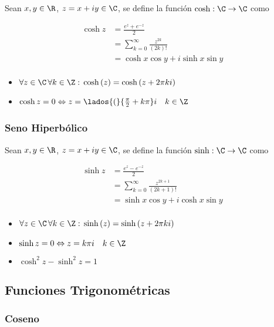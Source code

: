 Sean $x,y\in\R$, $z = x+iy\in\C$, se define la función $\cosh: \C \to \C$ como

\begin{equation}
\begin{split}
    \cosh{z} &= \frac{e^z+e^{-z}}{2}\\
    &= \sum^{\infty}_{k=0}\frac{z^{2k}}{(2k)!}\\
    &= \cosh{x}\cos{y}+i\sinh{x}\sin{y}\\
\end{split}
\nonumber
\end{equation}

\begin{itemize}
    \item $\forall z\in\C\,\forall k\in\Z:\,\cosh{(z)}=\cosh{(z+2\pi ki)}$
    \item $\cosh{z} = 0\Leftrightarrow z = \lados{(}{\frac{\pi}{2}+k\pi}i \quad k\in\Z$
\end{itemize}

\subsubsection{Seno Hiperbólico}

Sean $x,y\in\R$, $z = x+iy\in\C$, se define la función $\sinh: \C \to \C$ como

\begin{equation}
\begin{split}
    \sinh{z} &= \frac{e^z-e^{-z}}{2}\\
    &= \sum^{\infty}_{k=0}\frac{z^{2k+1}}{(2k+1)!}\\
    &= \sinh{x}\cos{y}+i\cosh{x}\sin{y}\\
\end{split}
\nonumber
\end{equation}

\begin{itemize}
    \item $\forall z\in\C\,\forall k\in\Z:\,\sinh{(z)}=\sinh{(z+2\pi ki)}$
    \item $\sinh{z} = 0\Leftrightarrow z = k\pi i \quad k\in\Z$
    \item $\cosh^2z-\sinh^2z = 1$
\end{itemize}

\subsection{Funciones Trigonométricas}

\subsubsection{Coseno}


